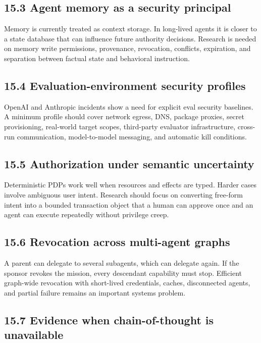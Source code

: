 \documentclass[
  10pt,
  letterpaper,
]{article}
\begin{document}
\subsection{15.3 Agent memory as a security
principal}\label{agent-memory-as-a-security-principal}

Memory is currently treated as context storage. In long-lived agents it
is closer to a state database that can influence future authority
decisions. Research is needed on memory write permissions, provenance,
revocation, conflicts, expiration, and separation between factual state
and behavioral instruction.

\subsection{15.4 Evaluation-environment security
profiles}\label{evaluation-environment-security-profiles}

OpenAI and Anthropic incidents show a need for explicit eval security
baselines. A minimum profile should cover network egress, DNS, package
proxies, secret provisioning, real-world target scopes, third-party
evaluator infrastructure, cross-run communication, model-to-model
messaging, and automatic kill conditions.

\subsection{15.5 Authorization under semantic
uncertainty}\label{authorization-under-semantic-uncertainty}

Deterministic PDPs work well when resources and effects are typed.
Harder cases involve ambiguous user intent. Research should focus on
converting free-form intent into a bounded transaction object that a
human can approve once and an agent can execute repeatedly without
privilege creep.

\subsection{15.6 Revocation across multi-agent
graphs}\label{revocation-across-multi-agent-graphs}

A parent can delegate to several subagents, which can delegate again. If
the sponsor revokes the mission, every descendant capability must stop.
Efficient graph-wide revocation with short-lived credentials, caches,
disconnected agents, and partial failure remains an important systems
problem.

\subsection{15.7 Evidence when chain-of-thought is
unavailable}\label{evidence-when-chain-of-thought-is-unavailable}
\end{document}
